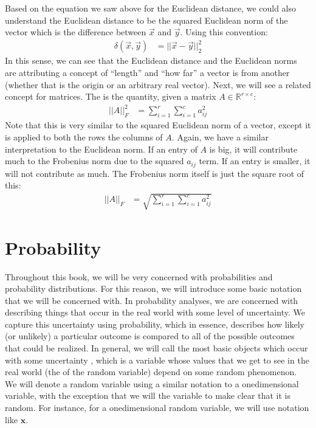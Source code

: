 \documentclass[letterpaper,10pt,english]{jupyterBook}
\begin{document}
\sphinxAtStartPar
Based on the equation we saw above for the Euclidean distance, we could also understand the Euclidean distance to be the squared Euclidean norm of the vector which is the difference between \(\vec x\) and \(\vec y\). Using this convention:
\begin{align*}
    \delta(\vec x, \vec y) &= ||\vec x - \vec y||_2^2
\end{align*}
\sphinxAtStartPar
In this sense, we can see that the Euclidean distance and the Euclidean norms are attributing a concept of “length” and “how far” a vector is from another (whether that is the origin or an arbitrary real vector). Next, we will see a related concept for matrices. The  is the quantity, given a matrix \(A \in \mathbb R^{r \times c}\):
\begin{align*}
    ||A||_F^2&= \sum_{i = 1}^r \sum_{i = 1}^c a_{ij}^2
\end{align*}
\sphinxAtStartPar
Note that this is very similar to the squared Euclidean norm of a vector, except it is applied to both the rows  the columns of \(A\). Again, we have a similar interpretation to the Euclidean norm. If an entry of \(A\) is big, it will contribute much to the Frobenius norm due to the squared \(a_{ij}\) term. If an entry is smaller, it will not contribute as much. The Frobenius norm itself is just the square root of this:
\begin{align*}
    ||A||_F &= \sqrt{\sum_{i = 1}^r \sum_{i = 1}^c a_{ij}^2}
\end{align*}

\section{Probability}
\label{\detokenize{introduction/terminology:probability}}
\sphinxAtStartPar
Throughout this book, we will be very concerned with probabilities and probability distributions. For this reason, we will introduce some basic notation that we will be concerned with. In probability analyses, we are concerned with describing things that occur in the real world with some level of uncertainty. We capture this uncertainty using probability, which in essence, describes how likely (or unlikely) a particular outcome is compared to all of the possible outcomes that could be realized. In general, we will call the most basic objects which occur with some uncertainty , which is a variable whose values that we get to see in the real world (the  of the random variable) depend on some random phenomenon. We will denote a random variable using a similar notation to a one\sphinxhyphen{}dimensional variable, with the exception that we will  the variable to make clear that it is random. For instance, for a one\sphinxhyphen{}dimensional random variable, we will use notation like \(\mathbf x\).
\end{document}
